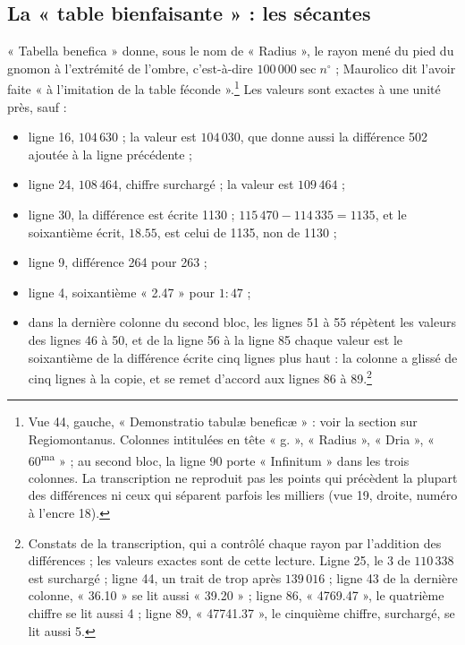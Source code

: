 \documentclass[11pt,a4paper]{article}
\begin{document}
\subsection*{La « table bienfaisante » : les sécantes}

« Tabella benefica » donne, sous le nom de « Radius », le rayon mené du pied du
gnomon à l'extrémité de l'ombre, c'est-à-dire $100\,000\sec n^\circ$ ; Maurolico
dit l'avoir faite « à l'imitation de la table féconde ».\footnote{Vue 44, gauche,
« Demonstratio tabulæ beneficæ » : voir la section sur Regiomontanus. Colonnes
intitulées en tête « g. », « Radius », « Dria », « 60\textsuperscript{ma} » ; au
second bloc, la ligne 90 porte « Infinitum » dans les trois colonnes. La
transcription ne reproduit pas les points qui précèdent la plupart des
différences ni ceux qui séparent parfois les milliers (vue 19, droite, numéro à
l'encre 18).} Les valeurs sont exactes à une unité près, sauf :

\begin{itemize}
  \item ligne 16, $104\,630$ ; la valeur est $104\,030$, que donne aussi la
    différence 502 ajoutée à la ligne précédente ;
  \item ligne 24, $108\,464$, chiffre surchargé ; la valeur est $109\,464$ ;
  \item ligne 30, la différence est écrite 1130 ; $115\,470 - 114\,335 = 1135$,
    et le soixantième écrit, $18.55$, est celui de 1135, non de 1130 ;
  \item ligne 9, différence 264 pour 263 ;
  \item ligne 4, soixantième « 2.47 » pour $1{:}47$ ;
  \item dans la dernière colonne du second bloc, les lignes 51 à 55 répètent les
    valeurs des lignes 46 à 50, et de la ligne 56 à la ligne 85 chaque valeur est
    le soixantième de la différence écrite cinq lignes plus haut : la colonne a
    glissé de cinq lignes à la copie, et se remet d'accord aux lignes 86 à
    89.\footnote{Constats de la transcription, qui a contrôlé chaque rayon par
    l'addition des différences ; les valeurs exactes sont de cette lecture.
    Ligne 25, le 3 de $110\,338$ est surchargé ; ligne 44, un trait de trop après
    $139\,016$ ; ligne 43 de la dernière colonne, « 36.10 » se lit aussi
    « 39.20 » ; ligne 86, « 4769.47 », le quatrième chiffre se lit aussi 4 ;
    ligne 89, « 47741.37 », le cinquième chiffre, surchargé, se lit aussi 5.}
\end{itemize}
\end{document}
